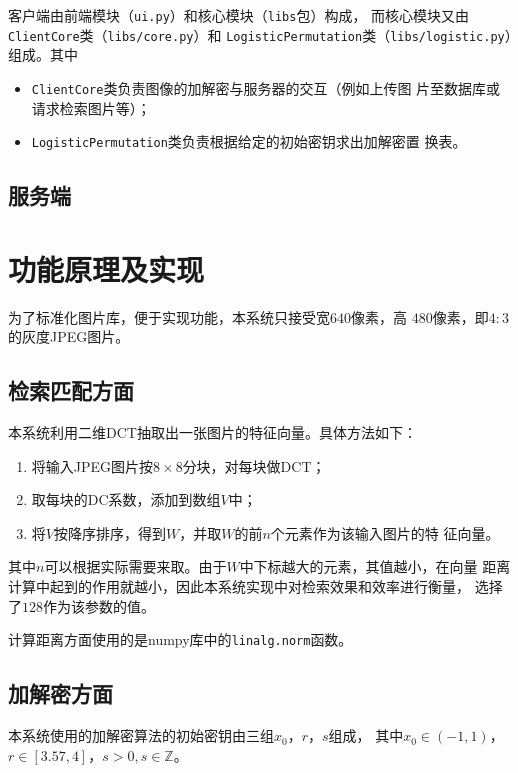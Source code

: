 
客户端由前端模块（\texttt{ui.py}）和核心模块（\texttt{libs}包）构成，
而核心模块又由\texttt{ClientCore}类（\texttt{libs/core.py}）和
\texttt{LogisticPermutation}类（\texttt{libs/logistic.py}）组成。其中
\begin{itemize}
\item \texttt{ClientCore}类负责图像的加解密与服务器的交互（例如上传图
  片至数据库或请求检索图片等）；
\item \texttt{LogisticPermutation}类负责根据给定的初始密钥求出加解密置
  换表。
\end{itemize}

\subsection{服务端}

\section{功能原理及实现}
\label{sec:func-impl}

为了标准化图片库，便于实现功能，本系统只接受宽$640$像素，高
$480$像素，即$4:3$的灰度JPEG图片。

\subsection{检索匹配方面}
\label{sec:retrieval-impl}
本系统利用二维DCT抽取出一张图片的特征向量。具体方法如下：
\begin{enumerate}
\item 将输入JPEG图片按$8 \times 8$分块，对每块做DCT；
\item 取每块的DC系数，添加到数组$V$中；
\item 将$V$按降序排序，得到$W$，并取$W$的前$n$个元素作为该输入图片的特
  征向量。
\end{enumerate}

其中$n$可以根据实际需要来取。由于$W$中下标越大的元素，其值越小，在向量
距离计算中起到的作用就越小，因此本系统实现中对检索效果和效率进行衡量，
选择了$128$作为该参数的值。

计算距离方面使用的是numpy库中的\texttt{linalg.norm}函数。

\subsection{加解密方面}
\label{sec:enc-dec-impl}

本系统使用的加解密算法的初始密钥由三组$x_0$，$r$，$s$组成，
其中$x_0 \in (-1, 1)$，$r \in [3.57, 4]$，$s > 0, s \in \mathbb{Z}$。

